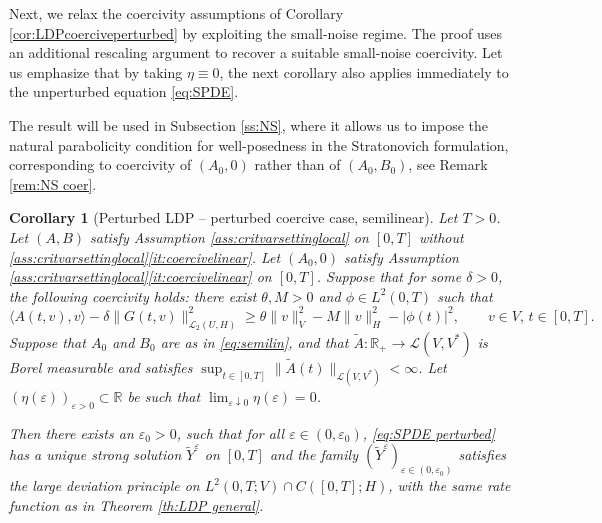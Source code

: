 \documentclass{amsart}
\newcommand{\<}{\langle}
\newcommand{\?}{\rangle}
\newcommand{\col}{\colon}
\theoremstyle{plain}
\theoremstyle{remark}
\theoremstyle{plain}
\newtheorem{corollary}[theorem]{Corollary}
\numberwithin{equation}{section}
\def\R{{\mathbb R}}
\newcommand{\eps}{\varepsilon}
\begin{document}
 
Next, we relax the coercivity assumptions of Corollary \ref{cor:LDPcoerciveperturbed} by exploiting the small-noise regime. The proof uses an additional rescaling argument to recover a suitable small-noise coercivity. Let us emphasize that by taking $\eta\equiv0$, the next corollary also applies immediately to the unperturbed equation \eqref{eq:SPDE}. 

The result will be used in Subsection \ref{ss:NS}, where it allows us to impose the natural parabolicity condition for well-posedness in the Stratonovich formulation, corresponding to coercivity of $(A_0,0)$ rather than of $(A_0,B_0)$, see Remark \ref{rem:NS coer}. 

\begin{corollary}[Perturbed LDP -- perturbed coercive case, semilinear]\label{cor:LDPcoerciveperturbed1}
Let $T>0$.  Let $(A,B)$ satisfy Assumption \ref{ass:critvarsettinglocal} on $[0,T]$ without  \ref{ass:critvarsettinglocal}\ref{it:coercivelinear}. Let 
   $(A_0,0)$ satisfy Assumption \ref{ass:critvarsettinglocal}\ref{it:coercivelinear} on $[0,T]$.  
    Suppose that for some $\delta>0$, the following coercivity holds: there exist $\theta,M>0$ and ${\phi}\in L^2(0,T)$ such that  
   \begin{equation}\label{eq:def coercive delta}
\<A(t,v),v\?-\delta \|G(t,v)\|_{\mathscr{L}_2(U,H)}^2 \geq \theta\|v\|_V^2-M\|v\|_H^2-|{\phi}(t)|^2,\qquad v\in V,\, t\in[0,T]. 
\end{equation}  
Suppose that $A_0$ and $B_0$ are as in \eqref{eq:semilin}, and that  $\tilde{A}\col \R_+ \to \mathscr{L}(V,V^*)$ is Borel measurable and satisfies    $\sup_{t\in[0,T]}\|\tilde{A}(t)\|_{\mathscr{L}(V,V^*)}<\infty$. Let $(\eta(\eps))_{\eps>0}\subset \R$ be such that  $\lim_{\eps\downarrow0}\eta(\eps)=0$. 
  
Then there exists an $\eps_0>0$, such that for all $\eps\in(0,\eps_0)$, \eqref{eq:SPDE perturbed} has a unique strong solution $\tilde{Y}^\eps$ on $[0,T]$ and the family $(\tilde{Y}^\eps)_{\eps\in(0,\eps_0)}$  
satisfies the large deviation principle on $L^2(0,T;V)\cap C([0,T];H)$, with the same  rate function as in Theorem \ref{th:LDP general}. 
\end{corollary}
\end{document}
